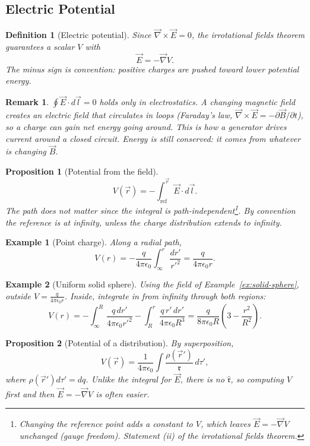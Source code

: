 \documentclass{article}
\newtheorem{definition}{Definition}
\newtheorem*{example}{Example}
\newtheorem{remark}{Remark}
\newtheorem{proposition}{Proposition}
\begin{document}
\subsection{Electric Potential}
\begin{definition}[Electric potential]
    Since $\vec{\nabla}\times\vec{E} = 0$, the irrotational fields theorem guarantees a scalar $V$ with
    \begin{equation}
        \vec{E} = -\vec{\nabla}V.
    \end{equation}
    The minus sign is convention: positive charges are pushed toward lower potential energy.
\end{definition}
\begin{remark}
    $\oint\vec{E}\cdot d\vec{l} = 0$ holds only in electrostatics. A changing magnetic field creates an electric field that circulates in loops (Faraday's law, $\vec{\nabla}\times\vec{E} = -\partial\vec{B}/\partial t$), so a charge can gain net energy going around. This is how a generator drives current around a closed circuit. Energy is still conserved: it comes from whatever is changing $\vec{B}$.
\end{remark}
\begin{proposition}[Potential from the field]
    \begin{equation}
        V(\vec{r}) = -\int_{\text{ref}}^{\vec{r}}\vec{E}\cdot d\vec{l}.
    \end{equation}
    The path does not matter since the integral is path-independent\footnote{Changing the reference point adds a constant to $V$, which leaves $\vec{E} = -\vec{\nabla}V$ unchanged (gauge freedom). Statement (ii) of the irrotational fields theorem.}. By convention the reference is at infinity, unless the charge distribution extends to infinity.
\end{proposition}
\begin{example}[Point charge]
    Along a radial path,
    \[V(r) = -\frac{q}{4\pi\epsilon_0}\int_\infty^r\frac{dr'}{r'^2} = \frac{q}{4\pi\epsilon_0 r}.\]
\end{example}
\begin{example}[Uniform solid sphere]
    Using the field of Example~\ref{ex:solid-sphere}, outside $V = \frac{q}{4\pi\epsilon_0 r}$. Inside, integrate in from infinity through both regions:
    \[V(r) = -\int_\infty^R\frac{q\,dr'}{4\pi\epsilon_0 r'^2} - \int_R^r\frac{q\,r'\,dr'}{4\pi\epsilon_0 R^3} = \frac{q}{8\pi\epsilon_0 R}\left(3 - \frac{r^2}{R^2}\right).\]
\end{example}
\begin{proposition}[Potential of a distribution]
    By superposition,
    \begin{equation}
        V(\vec{r}) = \frac{1}{4\pi\epsilon_0}\int\frac{\rho(\vec{r}')}{\mathfrak{r}}\,d\tau',
    \end{equation}
    where $\rho(\vec{r}')d\tau'=dq$. Unlike the integral for $\vec{E}$, there is no $\hat{\mathfrak{r}}$, so computing $V$ first and then $\vec{E} = -\vec{\nabla}V$ is often easier.
\end{proposition}
\end{document}
